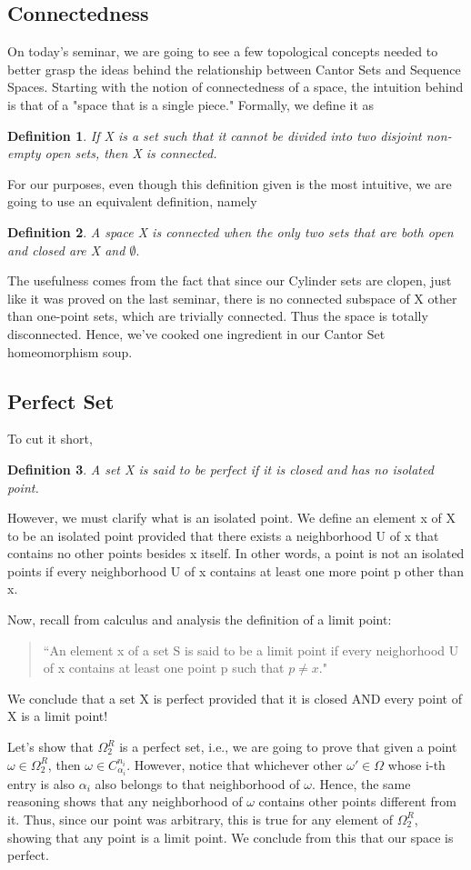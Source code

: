 \documentclass{article}
\newtheorem*{def*}{Definition}
\begin{document}
\subsection{Connectedness}
On today's seminar, we are going to see a few topological concepts needed to better grasp the ideas behind
the relationship between Cantor Sets and Sequence Spaces. Starting with the notion of connectedness of a space,
the intuition behind is that of a "space that is a single piece." Formally, we define it as
\begin{def*}
  If X is a set such that it cannot be divided into two disjoint non-empty open sets, then X is connected.
\end{def*}
For our purposes, even though this definition given is the most intuitive, we are going to use an equivalent 
definition, namely 
 \begin{def*}
   A space X is connected when the only two sets that are both open and closed are X and $\emptyset.$
 \end{def*}
 The usefulness comes from the fact that since our Cylinder sets are clopen, just like it was proved on the last
seminar, there is no connected subspace of X other than one-point sets, which are trivially connected. Thus the 
space is totally disconnected. Hence, we've cooked one ingredient in our Cantor Set homeomorphism soup.

\subsection{Perfect Set}
To cut it short, 
\begin{def*}
  A set X is said to be perfect if it is closed and has no isolated point.
\end{def*}
However, we must clarify what is an isolated point. We define an element x of X to be an isolated point provided
that there exists a neighborhood U of x that contains no other points besides x itself. In other words,
a point is not an isolated points if every neighborhood U of x contains at least one more point p other than x.

Now, recall from calculus and analysis the definition of a limit point:
\begin{quote}
  ``An element x of a set S is said to be a limit point if every neighorhood U of x contains at least one point
  p such that $p\neq{x}.$"  
\end{quote}
We conclude that a set X is perfect provided that it is closed AND every point of X is a limit point! 

Let's show that $\Omega _{2} ^{R}$ is a perfect set, i.e., we are going to prove that given a point $\omega\in\Omega _{2}^{R}$,
then $\omega\in{C _{\alpha_i}^{n_i}}.$ However, notice that whichever other $\omega'\in\Omega$ whose i-th entry is also
$\alpha_i$ also belongs to that neighborhood of $\omega$. Hence, the same reasoning shows that any neighborhood of
$\omega$ contains other points different from it. Thus, since our point was arbitrary, this is true for any element
of $\Omega _{2}^{R}$, showing that any point is a limit point. We conclude from this that our space is perfect.
\end{document}
